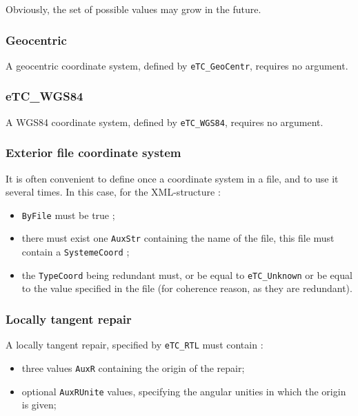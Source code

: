 Obviously, the set of possible values may grow in the future.


\subsubsection{Geocentric}

A geocentric coordinate system, defined by  {\tt eTC\_GeoCentr}, requires no argument.

\subsubsection{eTC\_WGS84}

A WGS84 coordinate system, defined by  {\tt eTC\_WGS84}, requires no argument.


\subsubsection{Exterior file coordinate system}

It is often convenient to define once a coordinate system in a file, and
to use it several times. In  this case, for the XML-structure :


\begin{itemize}
   \item {\tt ByFile} must be true ;
   \item there must exist one {\tt AuxStr} containing the name of the file, this file
         must contain a {\tt SystemeCoord} ;
   \item the  {\tt TypeCoord} being redundant must, or be equal to {\tt eTC\_Unknown} or
         be equal to the value specified in the file (for coherence reason, as they are
         redundant).
\end{itemize}


\subsubsection{Locally tangent repair}

A locally tangent repair, specified by {\tt eTC\_RTL} must contain :

\begin{itemize}
   \item three values {\tt AuxR} containing the origin of the repair;
   \item optional {\tt AuxRUnite} values, specifying the angular unities in  which
         the origin is given;
\end{itemize}

